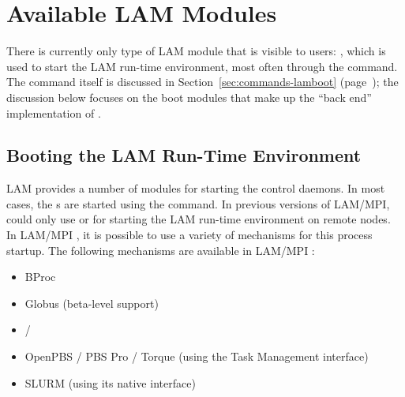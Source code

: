 %
% 
%
%

\chapter{Available LAM Modules}
\label{sec:lam-ssi}

There is currently only type of LAM module that is visible to users:
, which is used to start the LAM run-time environment, most
often through the  command.  The  command
itself is discussed in Section~\ref{sec:commands-lamboot}
(page~\pageref{sec:commands-lamboot}); the discussion below focuses on
the boot modules that make up the ``back end'' implementation of
.  


\section{Booting the LAM Run-Time Environment}
\label{sec:lam-ssi-boot}

LAM provides a number of modules for starting the  control
daemons.  In most cases, the s are started using the
 command.  In previous versions of LAM/MPI,
 could only use  or  for starting
the LAM run-time environment on remote nodes.  In LAM/MPI \lamversion,
it is possible to use a variety of mechanisms for this process
startup.  The following mechanisms are available in LAM/MPI
\lamversion:

\begin{itemize}
\item BProc
\item Globus (beta-level support)
\item {} / 
\item OpenPBS / PBS Pro / Torque (using the Task Management interface)
\item SLURM (using its native interface)
\end{itemize}

